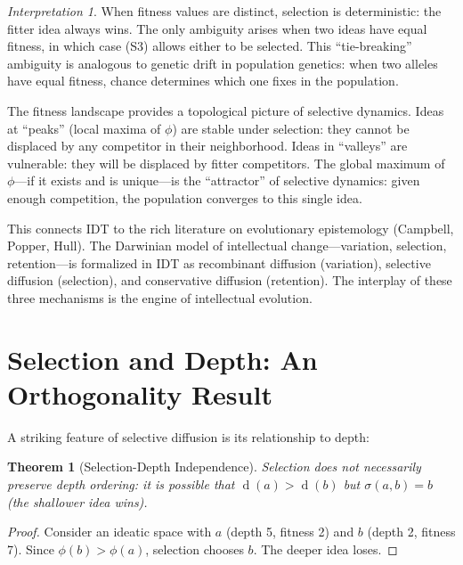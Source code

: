 \documentclass[11pt,openany]{book}
\theoremstyle{definition}
\theoremstyle{plain}
\newtheorem{theorem}[axiom]{Theorem}
\theoremstyle{remark}
\newtheorem{interpretation}[axiom]{Interpretation}
\newcommand{\depth}{\operatorname{d}}       %
\begin{document}
\begin{interpretation}
When fitness values are distinct, selection is deterministic: the fitter idea always wins. The only ambiguity arises when two ideas have equal fitness, in which case (S3) allows either to be selected. This ``tie-breaking'' ambiguity is analogous to genetic drift in population genetics: when two alleles have equal fitness, chance determines which one fixes in the population.

The fitness landscape provides a topological picture of selective dynamics. Ideas at ``peaks'' (local maxima of $\phi$) are stable under selection: they cannot be displaced by any competitor in their neighborhood. Ideas in ``valleys'' are vulnerable: they will be displaced by fitter competitors. The global maximum of $\phi$---if it exists and is unique---is the ``attractor'' of selective dynamics: given enough competition, the population converges to this single idea.

This connects IDT to the rich literature on evolutionary epistemology (Campbell, Popper, Hull). The Darwinian model of intellectual change---variation, selection, retention---is formalized in IDT as recombinant diffusion (variation), selective diffusion (selection), and conservative diffusion (retention). The interplay of these three mechanisms is the engine of intellectual evolution.
\end{interpretation}

\section{Selection and Depth: An Orthogonality Result}

A striking feature of selective diffusion is its relationship to depth:

\begin{theorem}[Selection-Depth Independence]
Selection does not necessarily preserve depth ordering: it is possible that $\depth(a) > \depth(b)$ but $\sigma(a, b) = b$ (the shallower idea wins).
\end{theorem}

\begin{proof}
Consider an ideatic space with $a$ (depth 5, fitness 2) and $b$ (depth 2, fitness 7). Since $\phi(b) > \phi(a)$, selection chooses $b$. The deeper idea loses.
\end{proof}
\end{document}
